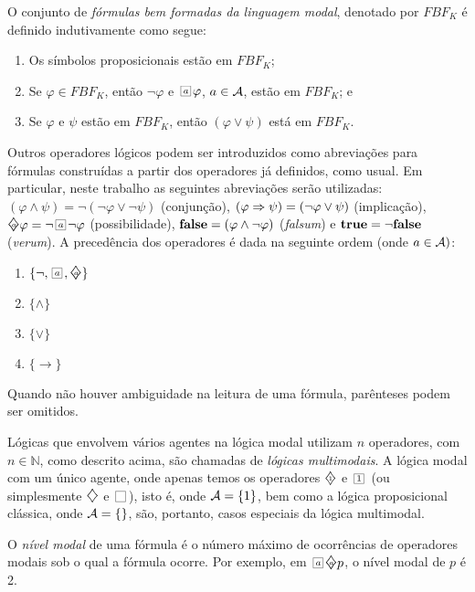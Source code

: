 \begin{definition} O conjunto de \textit{fórmulas bem formadas da linguagem modal}, denotado por
$FBF_{K}$ é definido indutivamente como segue:
    \label{def:fbf}

    \begin{enumerate}
    \item Os símbolos proposicionais estão em $FBF_{K}$;
    \item Se $\varphi \in FBF_{K}$, então $\neg \varphi$ e $\nec{\agent}\varphi$, $a \in {\cal{A}}$, estão em $FBF_{K}$; e
    \item Se $\varphi$ e $\psi$ estão em $FBF_{K}$, então $(\varphi \vee \psi)$ está em $FBF_{K}$.
    \end{enumerate}
    
\label{def:fbf}
\end{definition}

Outros operadores lógicos podem ser introduzidos como abreviações para fórmulas
construídas a partir dos operadores já definidos, como usual. Em particular,
neste trabalho as seguintes abreviações serão utilizadas: $(\varphi \land \psi)
= \neg (\neg \varphi \lor \neg \psi)$ (conjunção), $(\varphi \Rightarrow \psi) = (\neg
\varphi \lor \psi)$ (implicação), $\pos{\agent} \varphi= \neg \nec{\agent} \neg
\varphi$ (possibilidade), $\mbox{\rm\bf false} = (\varphi \land \neg \varphi)$
(\emph{falsum}) e $\mbox{\rm\bf true} = \neg \mbox{\rm\bf false}$ (\emph{verum}). A precedência dos
operadores é dada na seguinte ordem (onde $a \in {\cal{A}})$:
\begin{enumerate} 
    \item $\{\neg, \nec{\agent}, \pos{\agent}\}$ 
    \item $\{\wedge\}$ 
    \item $\{\vee\}$ 
    \item $\{\rightarrow\}$ 
\end{enumerate}

Quando não houver ambiguidade na leitura de uma fórmula, parênteses podem ser
omitidos.

Lógicas que envolvem vários agentes na lógica modal utilizam $n$ operadores, com
$n \in \mathbb{N}$, como descrito acima, são chamadas de \emph{lógicas
multimodais}. A lógica modal com um único agente, onde apenas temos os
operadores $\pos{1}$ e $\nec{1}$ (ou simplesmente $\pos{}$ e $\nec{}$), isto é,
onde ${\cal{A}} =\{1\}$, bem como a lógica proposicional clássica, onde ${\cal{A}} =
\{\}$, são, portanto, casos especiais da lógica multimodal.

O \emph{nível modal} de uma fórmula é o número máximo de ocorrências de
operadores modais sob o qual a fórmula ocorre. Por exemplo, em
$\nec{\agent}\pos{\agent}p$, o nível modal de $p$ é 2.

